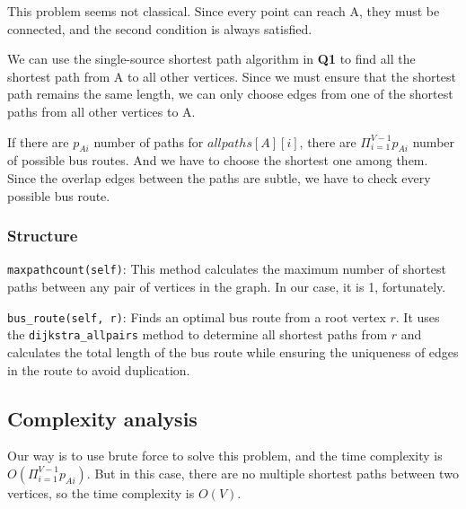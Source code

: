 \documentclass[UTF8]{ctexart}
\begin{document}
This problem seems not classical. Since every point can reach A, they must be connected, and the second condition is always satisfied.

We can use the single-source shortest path algorithm in \textbf{Q1} to find all the shortest path from A to all other vertices.
Since we must ensure that the shortest path remains the same length, we can only choose edges from
one of the shortest paths from all other vertices to A.

If there are $p_{Ai}$ number of paths for $allpaths[A][i]$, there are $\Pi_{i=1}^{V-1}p_{Ai}$ number of possible bus routes.
And we have to choose the shortest one among them. Since the overlap edges between the paths are subtle, we have to check every possible bus route.

\subsubsection*{Structure}
\texttt{maxpathcount(self)}: This method calculates the maximum number of shortest paths between any pair of vertices in the graph. In our case, it is 1, fortunately.

\texttt{bus\_route(self, r)}: Finds an optimal bus route from a root vertex \( r \). It uses the \texttt{dijkstra\_allpairs} method to determine all shortest paths from \( r \) and calculates the total length of the bus route while ensuring the uniqueness of edges in the route to avoid duplication.

\subsection*{Complexity analysis}
Our way is to use brute force to solve this problem, and the time complexity is $O(\Pi_{i=1}^{V-1}p_{Ai})$.
But in this case, there are no multiple shortest paths between two vertices, so the time complexity is $O(V)$.
\end{document}
